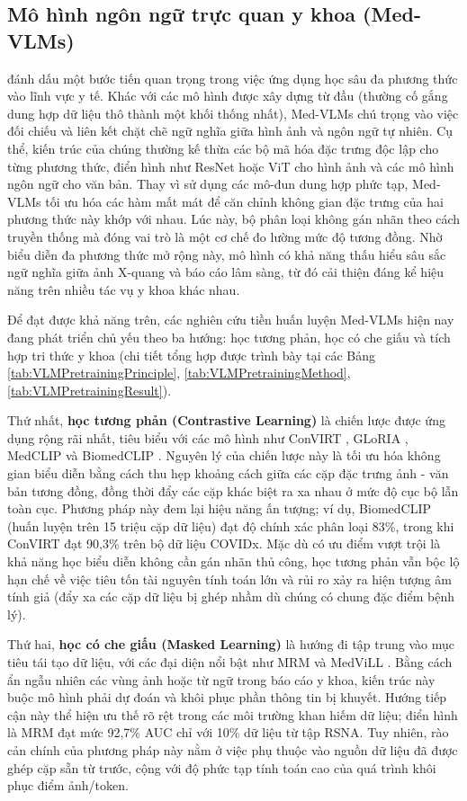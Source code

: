 \subsection{Mô hình ngôn ngữ trực quan y khoa (Med-VLMs)} đánh dấu một bước tiến quan trọng trong việc ứng dụng học sâu đa phương thức vào lĩnh vực y tế. Khác với các mô hình được xây dựng từ đầu (thường cố gắng dung hợp dữ liệu thô thành một khối thống nhất), Med-VLMs chú trọng vào việc đối chiếu và liên kết chặt chẽ ngữ nghĩa giữa hình ảnh và ngôn ngữ tự nhiên. Cụ thể, kiến trúc của chúng thường kế thừa các bộ mã hóa đặc trưng độc lập cho từng phương thức, điển hình như ResNet hoặc ViT cho hình ảnh và các mô hình ngôn ngữ cho văn bản. Thay vì sử dụng các mô-đun dung hợp phức tạp, Med-VLMs tối ưu hóa các hàm mất mát để căn chỉnh không gian đặc trưng của hai phương thức này khớp với nhau. Lúc này, bộ phân loại không gán nhãn theo cách truyền thống mà đóng vai trò là một cơ chế đo lường mức độ tương đồng. Nhờ biểu diễn đa phương thức mở rộng này, mô hình có khả năng thấu hiểu sâu sắc ngữ nghĩa giữa ảnh X-quang và báo cáo lâm sàng, từ đó cải thiện đáng kể hiệu năng trên nhiều tác vụ y khoa khác nhau.

Để đạt được khả năng trên, các nghiên cứu tiền huấn luyện Med-VLMs hiện nay đang phát triển chủ yếu theo ba hướng: học tương phản, học có che giấu và tích hợp tri thức y khoa (chi tiết tổng hợp được trình bày tại các Bảng \ref{tab:VLMPretrainingPrinciple}, \ref{tab:VLMPretrainingMethod}, \ref{tab:VLMPretrainingResult}).

Thứ nhất, \textbf{học tương phản (Contrastive Learning)} là chiến lược được ứng dụng rộng rãi nhất, tiêu biểu với các mô hình như ConVIRT \cite{ConVIRT}, GLoRIA \cite{GLoRIA}, MedCLIP \cite{MedCLIP} và BiomedCLIP \cite{BiomedCLIP}. Nguyên lý của chiến lược này là tối ưu hóa không gian biểu diễn bằng cách thu hẹp khoảng cách giữa các cặp đặc trưng ảnh - văn bản tương đồng, đồng thời đẩy các cặp khác biệt ra xa nhau ở mức độ cục bộ lẫn toàn cục. Phương pháp này đem lại hiệu năng ấn tượng; ví dụ, BiomedCLIP \cite{BiomedCLIP} (huấn luyện trên 15 triệu cặp dữ liệu) đạt độ chính xác phân loại 83\%, trong khi ConVIRT \cite{ConVIRT} đạt 90,3\% trên bộ dữ liệu COVIDx. Mặc dù có ưu điểm vượt trội là khả năng học biểu diễn không cần gán nhãn thủ công, học tương phản vẫn bộc lộ hạn chế về việc tiêu tốn tài nguyên tính toán lớn và rủi ro xảy ra hiện tượng âm tính giả (đẩy xa các cặp dữ liệu bị ghép nhầm dù chúng có chung đặc điểm bệnh lý).

Thứ hai, \textbf{học có che giấu (Masked Learning)} là hướng đi tập trung vào mục tiêu tái tạo dữ liệu, với các đại diện nổi bật như MRM \cite{MRM} và MedViLL \cite{MedViLL}. Bằng cách ẩn ngẫu nhiên các vùng ảnh hoặc từ ngữ trong báo cáo y khoa, kiến trúc này buộc mô hình phải dự đoán và khôi phục phần thông tin bị khuyết. Hướng tiếp cận này thể hiện ưu thế rõ rệt trong các môi trường khan hiếm dữ liệu; điển hình là MRM \cite{MRM} đạt mức 92,7\% AUC chỉ với 10\% dữ liệu từ tập RSNA. Tuy nhiên, rào cản chính của phương pháp này nằm ở việc phụ thuộc vào nguồn dữ liệu đã được ghép cặp sẵn từ trước, cộng với độ phức tạp tính toán cao của quá trình khôi phục điểm ảnh/token.

